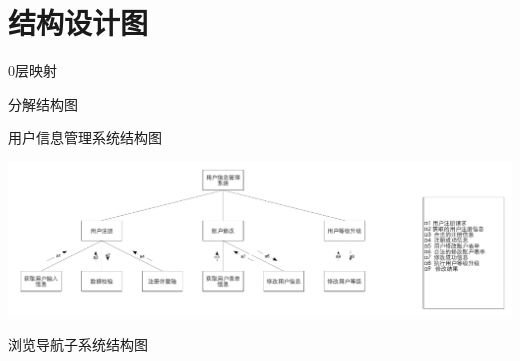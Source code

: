 \chapter{结构设计图}
0层映射

分解结构图

用户信息管理系统结构图

\begin{center}
    \includegraphics[width=1\linewidth]{ch6-img/0.png}
\end{center}

浏览导航子系统结构图
